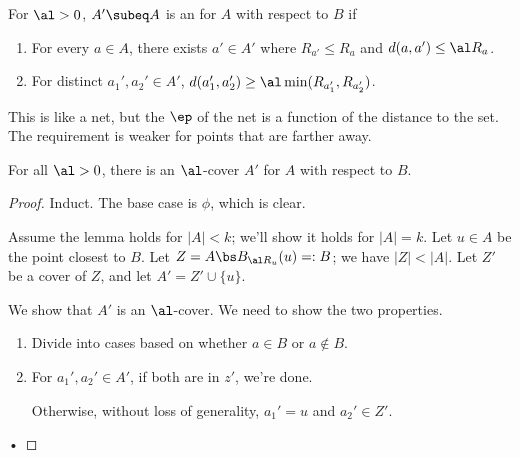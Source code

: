\begin{df}

For $\al>0$, $A'\subeq A$ is an  for $A$ with respect to $B$ if
\begin{enumerate}
\item
For every $a\in A$, there exists $a'\in A'$ where $R_{a'} \leq R_a$ and $d(a,a') \le \al R_a$.
\item
For distinct $a_1', a_2'\in A'$, $d(a_1', a_2')\ge \al \min(R_{a_1'},R_{a_2'})$.
\end{enumerate}
This is like a net, but the $\ep$ of the net is a function of the distance to the set. %
The requirement is weaker for points that are farther away.

\end{df}

\begin{lem}
For all $\al>0$, there is an $\al$-cover $A'$ for $A$ with respect to $B$. 
\end{lem}

\begin{proof}
Induct. The base case is $\phi$, which is clear.

Assume the lemma holds for $|A|<k$; we'll show it holds for $|A|=k$. Let $u\in A$ be the point closest to $B$. Let $Z=A\bs B_{\al R_u}(u)=:B$; we have $|Z|<|A|$. Let $Z'$ be a cover of $Z$, and let $A'=Z'\cup \{u\}$.

We show that $A'$ is an $\al$-cover. We need to show the two properties.
\begin{enumerate}
\item
Divide into cases based on whether $a\in B$ or $a\nin B$.
\item
For $a_1',a_2'\in A'$, if both are in $z'$, we're done. 

Otherwise, without loss of generality, $a_1'=u$ and $a_2' \in Z'$. 
\end{enumerate}•
\end{proof}


